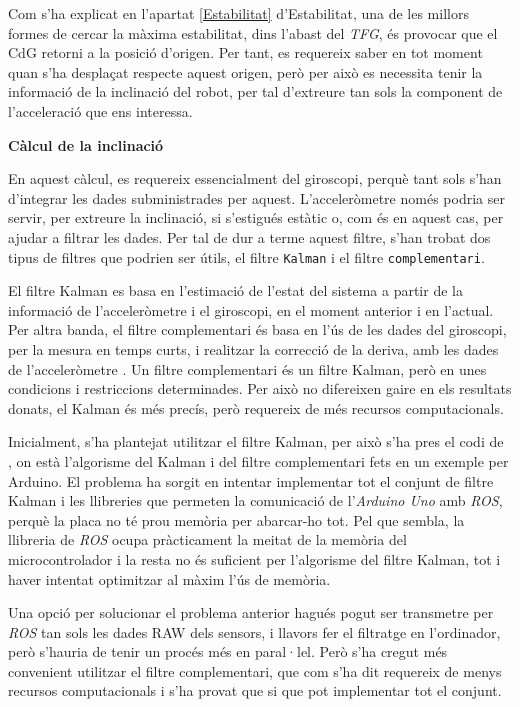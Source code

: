 \documentclass[12pt,a4paper,final,twoside]{article}
\begin{document}
Com s'ha explicat en l'apartat \ref{Estabilitat} d'Estabilitat, una de les millors formes de cercar la màxima estabilitat, dins l'abast del \textit{TFG}, és provocar que el CdG retorni a la posició d'origen. Per tant, es requereix saber en tot moment quan s'ha desplaçat respecte aquest origen, però per això es necessita tenir la informació de la inclinació del robot, per tal d'extreure tan sols la component de l'acceleració que ens interessa.


\vspace{20pt}
\textbf{Càlcul de la inclinació}

En aquest càlcul, es requereix essencialment del giroscopi, perquè tant sols s'han d'integrar les dades subministrades per aquest. L'acceleròmetre només podria ser servir, per extreure la inclinació, si s'estigués estàtic o, com és en aquest cas, per ajudar a filtrar les dades. Per tal de dur a terme aquest filtre, s'han trobat dos tipus de filtres que podrien ser útils, el filtre \texttt{Kalman} i el filtre \texttt{complementari}.

El filtre Kalman es basa en l'estimació de l'estat del sistema a partir de la informació de l'acceleròmetre i el giroscopi, en el moment anterior i en l'actual. Per altra banda, el filtre complementari és basa en l'ús de les dades del giroscopi, per la mesura en temps curts, i realitzar la correcció de la deriva, amb les dades de l'acceleròmetre \cite{Gaydou2011}. Un filtre complementari és un filtre Kalman, però en unes condicions i restriccions determinades. Per això no difereixen gaire en els resultats donats, el Kalman és més precís, però requereix de més recursos computacionals.

Inicialment, s'ha plantejat utilitzar el filtre Kalman, per això s'ha pres el codi de \cite{Lauszus2012}, on està l'algorisme del Kalman i del filtre complementari fets en un exemple per Arduino. El problema ha sorgit en intentar implementar tot el conjunt de filtre Kalman i les llibreries que permeten la comunicació de l'\textit{Arduino Uno} amb \textit{ROS}, perquè la placa no té prou memòria per abarcar-ho tot. Pel que sembla, la llibreria de \textit{ROS} ocupa pràcticament la meitat de la memòria del microcontrolador i la resta no és suficient per l'algorisme del filtre Kalman, tot i haver intentat optimitzar al màxim l'ús de memòria.

Una opció per solucionar el problema anterior hagués pogut ser transmetre per \textit{ROS} tan sols les dades RAW dels sensors, i llavors fer el filtratge en l'ordinador, però s'hauria de tenir un procés més en paral·lel. Però s'ha cregut més convenient utilitzar el filtre complementari, que com s'ha dit requereix de menys recursos computacionals i s'ha provat que si que pot implementar tot el conjunt.
\end{document}
